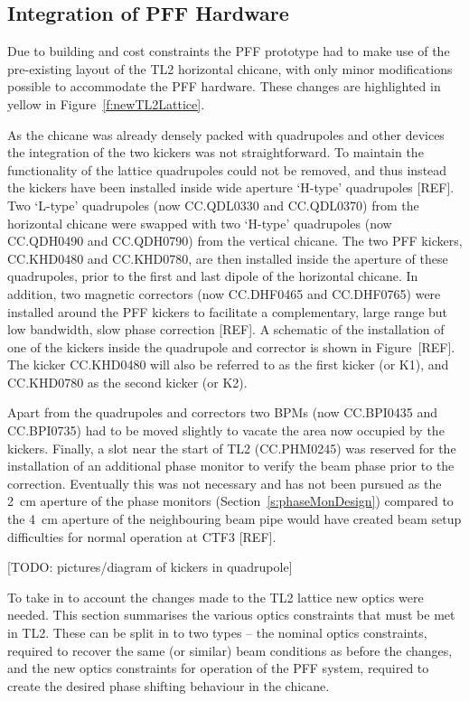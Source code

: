 \subsection{Integration of PFF Hardware}
\label{ss:tl2PFFIntegration}

Due to building and cost constraints the PFF prototype had to make use of the pre-existing layout of the TL2 horizontal chicane, with only minor modifications possible to accommodate the PFF hardware. These changes are highlighted in yellow in Figure~\ref{f:newTL2Lattice}.

As the chicane was already densely packed with quadrupoles and other devices the integration of the two kickers was not straightforward. To maintain the functionality of the lattice quadrupoles could not be removed, and thus instead the kickers have been installed inside wide aperture `H-type' quadrupoles [REF]. Two `L-type' quadrupoles (now CC.QDL0330 and CC.QDL0370) from the horizontal chicane were swapped with two `H-type' quadrupoles (now CC.QDH0490 and CC.QDH0790) from the vertical chicane. The two PFF kickers, CC.KHD0480 and CC.KHD0780, are then installed inside the aperture of these quadrupoles, prior to the first and last dipole of the horizontal chicane. In addition, two magnetic correctors (now CC.DHF0465 and CC.DHF0765) were installed around the PFF kickers to facilitate a complementary, large range but low bandwidth, slow phase correction [REF]. A schematic of the installation of one of the kickers inside the quadrupole and corrector is shown in Figure~[REF]. The kicker CC.KHD0480 will also be referred to as the first kicker (or K1), and CC.KHD0780 as the second kicker (or K2).

Apart from the quadrupoles and correctors two BPMs (now CC.BPI0435 and CC.BPI0735) had to be moved slightly to vacate the area now occupied by the kickers. Finally, a slot near the start of TL2 (CC.PHM0245) was reserved for the installation of an additional phase monitor to verify the beam phase prior to the correction. Eventually this was not necessary and has not been pursued as the 2~cm aperture of the phase monitors (Section~\ref{s:phaseMonDesign}) compared to the 4~cm aperture of the neighbouring beam pipe would have created beam setup difficulties for normal operation at CTF3 [REF].

[TODO: pictures/diagram of kickers in quadrupole]


To take in to account the changes made to the TL2 lattice new optics were needed. This section summarises the various optics constraints that must be met in TL2. These can be split in to two types -- the nominal optics constraints, required to recover the same (or similar) beam conditions as before the changes, and the new optics constraints for operation of the PFF system, required to create the desired phase shifting behaviour in the chicane.

